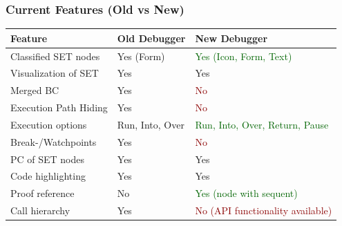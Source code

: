 \documentclass[accentcolor=tud9d,colorbacktitle,inverttitle,landscape,english,presentation,t]{tudbeamer}
\begin{document}
   	\begin{frame}[t]
		\frametitle{Current Features (Old vs New)}
      
      \begin{table}
         \centering
            \begin{tabular}{|l|l|l|}
               \hline
               Feature & Old Debugger & New Debugger \\
               \hline
               \hline
               Classified SET nodes & Yes (Form) & \textcolor{darkgreen}{Yes (Icon, Form, Text)} \\
               Visualization of SET & Yes & Yes \\
               Merged BC & Yes & \textcolor{darkred}{No} \\
               Execution Path Hiding & Yes & \textcolor{darkred}{No} \\ %
               Execution options & Run, Into, Over & \textcolor{darkgreen}{Run, Into, Over, Return, Pause} \\
               Break-/Watchpoints & Yes & \textcolor{darkred}{No} \\
               PC of SET nodes & Yes & Yes \\
               Code highlighting & Yes & Yes \\
               Proof reference & No & \textcolor{darkgreen}{Yes (node with sequent)} \\
               Call hierarchy & Yes & \textcolor{darkred}{No (API functionality available)} \\
               \hline
            \end{tabular}
      \end{table}
	\end{frame}
   
\end{document}
